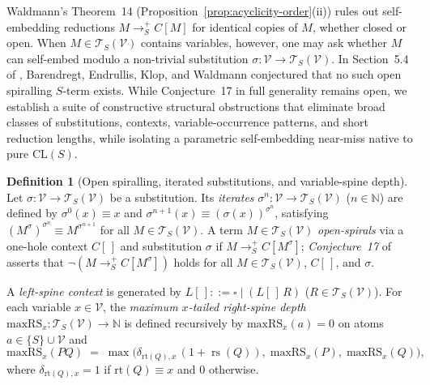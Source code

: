 \documentclass[11pt,reqno]{amsart}
\numberwithin{equation}{section}
\theoremstyle{plain}
\theoremstyle{definition}
\newtheorem{definition}[theorem]{Definition}
\theoremstyle{remark}
\DeclareMathOperator{\rs}{rs}
\newcommand{\CLS}{\mathrm{CL}(S)}
\newcommand{\TSV}{\mathcal{T}_S(\mathcal{V})}
\newcommand{\redSp}{\to_S^+}
\begin{document}
Waldmann's Theorem~14 (Proposition~\ref{prop:acyclicity-order}(ii)) rules out self-embedding reductions $M \redSp C[M]$ for identical copies of $M$, whether closed or open. When $M \in \TSV$ contains variables, however, one may ask whether $M$ can self-embed modulo a non-trivial substitution $\sigma \colon \mathcal{V} \to \TSV$. In Section~5.4 of \cite[Definition~11(iii) and Conjecture~17, pp.~86, 89]{BarendregtEndrullisKlopWaldmann2017}, Barendregt, Endrullis, Klop, and Waldmann conjectured that no such open spiralling $S$-term exists. While Conjecture~17 in full generality remains open, we establish a suite of constructive structural obstructions that eliminate broad classes of substitutions, contexts, variable-occurrence patterns, and short reduction lengths, while isolating a parametric self-embedding near-miss native to pure $\CLS$.

\begin{definition}[Open spiralling, iterated substitutions, and variable-spine depth]\label{def:open-spiral}
Let $\sigma \colon \mathcal{V} \to \TSV$ be a substitution. Its \emph{iterates} $\sigma^n \colon \mathcal{V} \to \TSV$ ($n \in \mathbb{N}$) are defined by $\sigma^0(x) \equiv x$ and $\sigma^{n+1}(x) \equiv (\sigma(x))^{\sigma^n}$, satisfying $(M^\sigma)^{\sigma^n} \equiv M^{\sigma^{n+1}}$ for all $M \in \TSV$. A term $M \in \TSV$ \emph{open-spirals} via a one-hole context $C[\,]$ and substitution $\sigma$ if $M \redSp C[M^\sigma]$; \emph{Conjecture~17} of \cite{BarendregtEndrullisKlopWaldmann2017} asserts that $\neg(M \redSp C[M^\sigma])$ holds for all $M \in \TSV$, $C[\,]$, and $\sigma$.

A \emph{left-spine context} is generated by $L[\,] ::= \square \mid (L[\,]\,R)$ ($R \in \TSV$). For each variable $x \in \mathcal{V}$, the \emph{maximum $x$-tailed right-spine depth} $\mathrm{maxRS}_x \colon \TSV \to \mathbb{N}$ is defined recursively by $\mathrm{maxRS}_x(a) = 0$ on atoms $a \in \{S\} \cup \mathcal{V}$ and
\[
  \mathrm{maxRS}_x(P Q) \;=\; \max\bigl(\delta_{\mathrm{rt}(Q), x}\,(1 + \rs(Q)),\; \mathrm{maxRS}_x(P),\; \mathrm{maxRS}_x(Q)\bigr),
\]
where $\delta_{\mathrm{rt}(Q), x} = 1$ if $\mathrm{rt}(Q) \equiv x$ and $0$ otherwise.
\end{definition}
\end{document}

